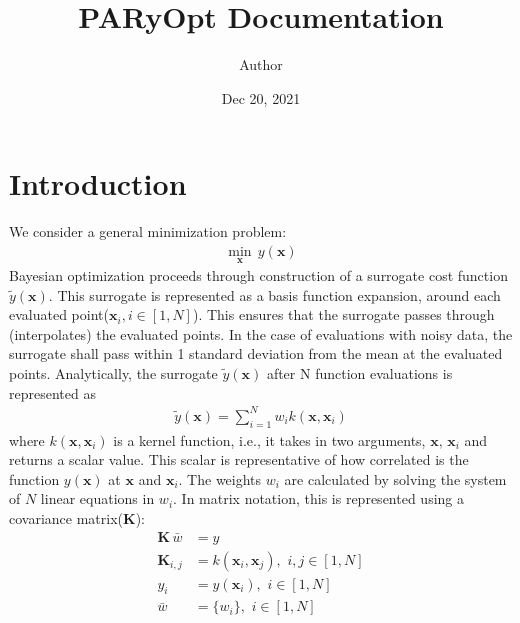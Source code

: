 \documentclass[letterpaper,12pt,english]{sphinxmanual}
\title{PARyOpt Documentation}
\date{Dec 20, 2021}
\author{Author}
\begin{document}
\pagestyle{empty}
\sphinxmaketitle
\pagestyle{plain}
\sphinxtableofcontents
\pagestyle{normal}
\label{\detokenize{index::doc}}



\chapter{Introduction}
\label{\detokenize{introduction:introduction}}\label{\detokenize{introduction::doc}}
\sphinxAtStartPar
We consider a general minimization problem:
\begin{equation*}
\begin{split}\min_\mathbf{x} \, y(\mathbf{x})\end{split}
\end{equation*}
\sphinxAtStartPar
Bayesian optimization proceeds through construction of a surrogate cost
function \(\tilde{y}(\mathbf{x})\). This surrogate is represented as a basis
function expansion, around each evaluated point(\(\mathbf{x}_i, i \in [1,N]\)).
This ensures that the surrogate passes through (interpolates) the evaluated
points. In the case of evaluations with noisy data, the surrogate shall pass
within 1 standard deviation from the mean at the evaluated points.
Analytically, the surrogate \(\tilde{y}(\mathbf{x})\) after N function
evaluations is represented as
\begin{equation*}
\begin{split}\tilde{y}(\mathbf{x}) = \sum_{i=1}^N w_i k(\mathbf{x}, \mathbf{x}_i)\end{split}
\end{equation*}
\sphinxAtStartPar
where \(k(\mathbf{x}, \mathbf{x}_i)\) is a kernel function, i.e., it takes in two arguments,
\(\mathbf{x}, \, \mathbf{x}_i\) and returns a scalar value. This scalar is representative of how correlated is
the function \(y(\mathbf{x})\) at \(\mathbf{x}\) and \(\mathbf{x}_i\). The weights \(w_i\) are
calculated by solving the system of \(N\) linear equations in \(w_i\). In matrix notation, this is represented
using a covariance matrix(\(\mathbf{K}\)):
\begin{equation*}
\begin{split}\mathbf{K}\, \bar{w} & = y \\
\mathbf{K}_{i,j} & = k(\mathbf{x}_i, \mathbf{x}_j) , \, \, i,j\in[1,N] \\
y_i & = y(\mathbf{x}_i) , \, \,i\in[1,N] \\
\bar{w} & = \{w_i\}, \, \,i\in[1,N]\end{split}
\end{equation*}
\end{document}
